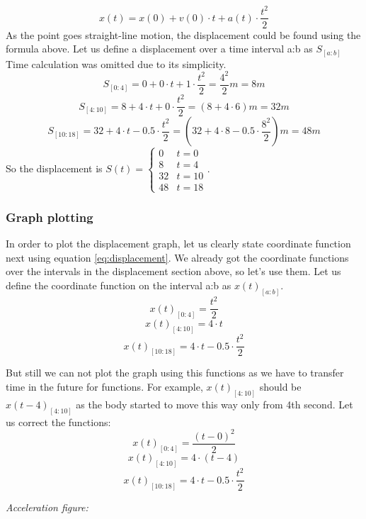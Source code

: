 \documentclass{article}
\begin{document}
\begin{equation}
    \label{eq:displacement}
    x(t) = x(0) + v(0) \cdot t + a(t) \cdot \frac{t^2}{2}
\end{equation}
As the point goes straight-line motion, the displacement could be found using the formula above.
Let us define a displacement over a time interval a:b as $ S_{[a:b]} $
Time calculation was omitted due to its simplicity.
$$ S_{[0:4]} = 0 + 0 \cdot t + 1 \cdot \frac{t^2}{2} = \frac{4^2}{2}m = 8m $$
$$ S_{[4:10]} = 8 + 4 \cdot t + 0 \cdot \frac{t^2}{2} = (8 + 4 \cdot 6)m = 32m $$
$$ S_{[10:18]} = 32 + 4 \cdot t - 0.5 \cdot \frac{t^2}{2} = (32 + 4 \cdot 8 - 0.5 \cdot \frac{8^2}{2})m = 48m $$
So the displacement is $S(t) = \begin{cases} 0 & t = 0 \\ 8 & t = 4 \\ 32 & t = 10 \\ 48 & t = 18 \end{cases}$.

\subsubsection*{Graph plotting}
In order to plot the displacement graph, let us clearly state coordinate function next using equation \ref{eq:displacement}.
We already got the coordinate functions over the intervals in the displacement section above, so let's use them.
Let us define the coordinate function on the interval a:b as $ x(t)_{[a:b]} $.
$$ x(t)_{[0:4]} = \frac{t^2}{2} $$
$$ x(t)_{[4:10]} = 4 \cdot t $$
$$ x(t)_{[10:18]} = 4 \cdot t - 0.5 \cdot \frac{t^2}{2} $$

But still we can not plot the graph using this functions as we have to transfer time in the future for functions. For example, $x(t)_{[4:10]}$ should be $x(t-4)_{[4:10]}$ as the body started to move this way only from 4th second.
Let us correct the functions:
$$ x(t)_{[0:4]} = \frac{(t-0)^2}{2} $$
$$ x(t)_{[4:10]} = 4 \cdot (t-4) $$
$$ x(t)_{[10:18]} = 4 \cdot t - 0.5 \cdot \frac{t^2}{2} $$

\newpage %

\textit{Acceleration figure:}
\end{document}
